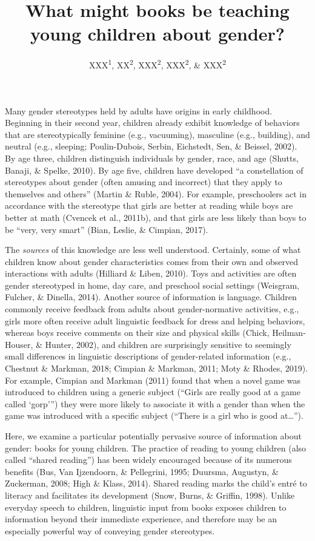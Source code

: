 \documentclass[
  english,
  ,man,floatsintext]{apa6}
\title{What might books be teaching young children about gender?}
\author{XXX\textsuperscript{1}, XX\textsuperscript{2}, XXX\textsuperscript{2}, XXX\textsuperscript{2}, \& XXX\textsuperscript{2}}
\date{}
\affiliation{\vspace{0.5cm}\textsuperscript{1} XXX\\\textsuperscript{2} XXX}
\begin{document}
\maketitle

Many gender stereotypes held by adults have origins in early childhood. Beginning in their second year, children already exhibit knowledge of behaviors that are stereotypically feminine (e.g., vacuuming), masculine (e.g., building), and neutral (e.g., sleeping; Poulin-Dubois, Serbin, Eichstedt, Sen, \& Beissel, 2002). By age three, children distinguish individuals by gender, race, and age (Shutts, Banaji, \& Spelke, 2010). By age five, children have developed \enquote{a constellation of stereotypes about gender (often amusing and incorrect) that they apply to themselves and others} (Martin \& Ruble, 2004). For example, preschoolers act in accordance with the stereotype that girls are better at reading while boys are better at math (Cvencek et al., 2011b), and that girls are less likely than boys to be \enquote{very, very smart} (Bian, Leslie, \& Cimpian, 2017).

The \emph{sources} of this knowledge are less well understood. Certainly, some of what children know about gender characteristics comes from their own and observed interactions with adults (Hilliard \& Liben, 2010). Toys and activities are often gender stereotyped in home, day care, and preschool social settings (Weisgram, Fulcher, \& Dinella, 2014). Another source of information is language. Children commonly receive feedback from adults about gender-normative activities, e.g., girls more often receive adult linguistic feedback for dress and helping behaviors, whereas boys receive comments on their size and physical skills (Chick, Heilman-Houser, \& Hunter, 2002), and children are surprisingly sensitive to seemingly small differences in linguistic descriptions of gender-related information (e.g., Chestnut \& Markman, 2018; Cimpian \& Markman, 2011; Moty \& Rhodes, 2019). For example, Cimpian and Markman (2011) found that when a novel game was introduced to children using a generic subject (\enquote{Girls are really good at a game called \enquote{gorp}}) they were more likely to associate it with a gender than when the game was introduced with a specific subject (\enquote{There is a girl who is good at\ldots{}}).

Here, we examine a particular potentially pervasive source of information about gender: books for young children. The practice of reading to young children (also called \enquote{shared reading}) has been widely encouraged because of its numerous benefits (Bus, Van Ijzendoorn, \& Pellegrini, 1995; Duursma, Augustyn, \& Zuckerman, 2008; High \& Klass, 2014). Shared reading marks the child's entré to literacy and facilitates its development (Snow, Burns, \& Griffin, 1998). Unlike everyday speech to children, linguistic input from books exposes children to information beyond their immediate experience, and therefore may be an especially powerful way of conveying gender stereotypes.
\end{document}
